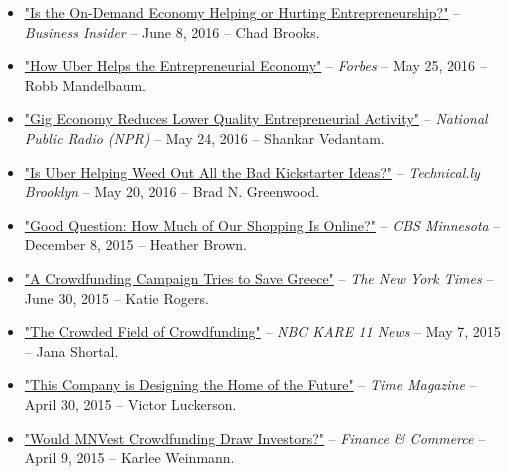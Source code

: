 \documentclass[10.5pt,letterpaper,sans]{moderncv}        %
\begin{document}
\begin{itemize}
\item \textcolor{gray}{\href{http://www.businessnewsdaily.com/9132-on-demand-economy-effect.html}{"Is the On-Demand Economy Helping or Hurting Entrepreneurship?"}} -- \textit{Business Insider} -- June 8, 2016 -- Chad Brooks.

\item \textcolor{gray}{\href{http://www.forbes.com/sites/robbmandelbaum/2016/05/25/how-uber-helps-the-entrepreneurial-economy}{"How Uber Helps the Entrepreneurial Economy"}} -- \textit{Forbes} -- May 25, 2016 -- Robb Mandelbaum.

\item \textcolor{gray}{\href{http://www.npr.org/2016/05/24/479274199/gig-economy-reduces-lower-quality-entrepreneurial-activity-study-shows}{"Gig Economy Reduces Lower Quality Entrepreneurial Activity"}} -- \textit{National Public Radio (NPR)} -- May 24, 2016 -- Shankar Vedantam.

\item \textcolor{gray}{\href{http://technical.ly/brooklyn/2016/05/20/uber-kickstarter-brad-greenwood/}{"Is Uber Helping Weed Out All the Bad Kickstarter Ideas?"}} -- \textit{Technical.ly Brooklyn} -- May 20, 2016 -- Brad N. Greenwood.

\item \textcolor{gray}{\href{http://minnesota.cbslocal.com/2015/12/08/good-question-how-much-of-our-shopping-is-online/}{"Good Question: How Much of Our Shopping Is Online?"}} -- \textit{CBS Minnesota} -- December 8, 2015 -- Heather Brown.

\item \textcolor{gray}{\href{http://www.nytimes.com/2015/07/01/world/europe/a-crowdfunding-campaign-tries-to-save-greece.html}{"A Crowdfunding Campaign Tries to Save Greece"}} -- \textit{The New York Times} -- June 30, 2015 -- Katie Rogers. 

\item \textcolor{gray}{\href{http://www.kare11.com/story/news/local/2015/05/06/the-crowded-field-of-crowdfunding/70921732/}{"The Crowded Field of Crowdfunding"}} -- \textit{NBC KARE 11 News} -- May 7, 2015 -- Jana Shortal.

\item \textcolor{gray}{\href{http://time.com/3841448/this-company-is-designing-the-home-of-the-future/}{"This Company is Designing the Home of the Future"}} -- \textit{Time Magazine} -- April 30, 2015 -- Victor Luckerson.

\item \textcolor{gray}{\href{http://finance-commerce.com/2015/04/would-mnvest-crowdfunding-draw-investors/}{"Would MNVest Crowdfunding Draw Investors?"}} -- \textit{Finance \& Commerce} -- April 9, 2015 -- Karlee Weinmann.


\end{itemize}
\end{document}
